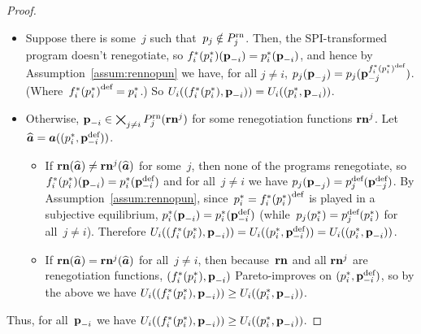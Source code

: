 \documentclass[sigconf]{aamas}
\theoremstyle{definition}
\begin{document}
\begin{proof}
\begin{itemize}
    \item Suppose there is some~$j$ such
    that~$p_j \notin P_j^{\textnormal{rn}}$.
    Then,
    the SPI-transformed program
    doesn't renegotiate,
    so $f_i^*(p_i^*)(\textbf{p}_{-i}) = p_i^*(\textbf{p}_{-i})$,
    and hence by Assumption~\ref{assum:rennopun}
    we have, for all $j \neq i$,
    $p_j(\textbf{p}_{-j}) = p_j(\textbf{p}_{-j}^{{f_i^*(p_i^*)}^{\textnormal{def}}})$.
    (Where~${f_i^*(p_i^*)}^{\textnormal{def}} = p_i^*$.)
    So $U_i((f_i^*(p_i^*), \textbf{p}_{-i})) = U_i((p_i^*, \textbf{p}_{-i}))$.
    \item Otherwise, $\textbf{p}_{-i} \in \bigtimes_{j \neq i} P_j^{\textnormal{rn}}(\mathbf{rn}^j)$
    for some renegotiation functions $\mathbf{rn}^j$. Let $\widehat{\boldsymbol{a}} = \boldsymbol{a}((p_i^*, {\textbf{p}}^{\textnormal{def}}_{-i}))$. 
    \begin{itemize}
        \item 
         If $\mathbf{rn}(\widehat{\boldsymbol{a}}) \neq \mathbf{rn}^j(\widehat{\boldsymbol{a}})$ for some~$j$,
         then none of the programs renegotiate,
         so 
         $f_i^*(p_i^*)(\textbf{p}_{-i}) = p_i^*({\textbf{p}}^{\textnormal{def}}_{-i})$
         and for all~$j \neq i$ we have $p_j(\textbf{p}_{-j}) = p_j^{\textnormal{def}}({\textbf{p}}^{\textnormal{def}}_{-j})$.
         By Assumption~\ref{assum:rennopun},
         since~$p_i^* = {f_i^*(p_i^*)}^{\textnormal{def}}$ is played in a subjective equilibrium,
         $p_i^*(\textbf{p}_{-i}) = p_i^*({\textbf{p}}^{\textnormal{def}}_{-i})$
         (while~$p_j(p_i^*) = p_j^{\textnormal{def}}(p_i^*)$ for all~$j \neq i$).
         Therefore 
         $U_i((f_i^*(p_i^*), \textbf{p}_{-i})) = U_i((p_i^*, {\textbf{p}}^{\textnormal{def}}_{-i})) = U_i((p_i^*, \textbf{p}_{-i}))$.
        \item If $\mathbf{rn}(\widehat{\boldsymbol{a}}) = \mathbf{rn}^j(\widehat{\boldsymbol{a}})$ for all~$j \neq i$,
        then because~$\mathbf{rn}$ and all $\mathbf{rn}^j$
        are renegotiation functions,
        $(f_i^*(p_i^*), \textbf{p}_{-i})$ Pareto-improves on $(p_i^*, {\textbf{p}}^{\textnormal{def}}_{-i})$,
        so by the above we have 
        $U_i((f_i^*(p_i^*), \textbf{p}_{-i})) \geq U_i((p_i^*, \textbf{p}_{-i}))$.
    \end{itemize}
\end{itemize}
Thus, for all~$\textbf{p}_{-i}$ we have
$U_i((f_i^*(p_i^*), \textbf{p}_{-i})) \geq U_i((p_i^*, \textbf{p}_{-i}))$.


\end{proof}
\end{document}
